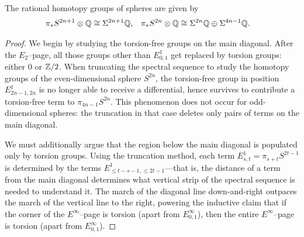 \begin{corollary}
The rational homotopy groups of spheres are given by
\begin{align*}
\pi_* S^{2n+1} \otimes \mathbb Q & \cong \Sigma^{2n+1} \mathbb Q, &
\pi_* S^{2n} \otimes \mathbb Q & \cong \Sigma^{2n} \mathbb Q \oplus \Sigma^{4n-1} \mathbb Q.
\end{align*}
\end{corollary}
\begin{proof}
We begin by studying the torsion-free groups on the main diagonal.
After the $E_2$--page, all those groups other than $E^1_{0,1}$ get replaced by torsion groups: either $0$ or $\mathbb Z/2$.
When truncating the spectral sequence to study the homotopy groups of the even-dimensional sphere $S^{2n}$, the torsion-free group in position $E^1_{2n-1, 2n}$ is no longer able to receive a differential, hence survives to contribute a torsion-free term to $\pi_{4n-1} S^{2n}$.
This phenomenon does not occur for odd-dimensional spheres: the truncation in that case deletes only pairs of terms on the main diagonal.

We must additionally argue that the region below the main diagonal is populated only by torsion groups.
Using the truncation method, each term $E^1_{s, t} = \pi_{s+t} S^{2t-1}$ is determined by the terms $E^1_{\le t-s-1, \le 2t-1}$---that is, the distance of a term from the main diagonal determines what vertical strip of the spectral sequence is needed to understand it.
The march of the diagonal line down-and-right outpaces the march of the vertical line to the right, powering the inductive claim that if the corner of the $E^\infty$--page is torsion (apart from $E^\infty_{0,1}$), then the entire $E^\infty$--page is torsion (apart from $E^\infty_{0,1}$).
\end{proof}
